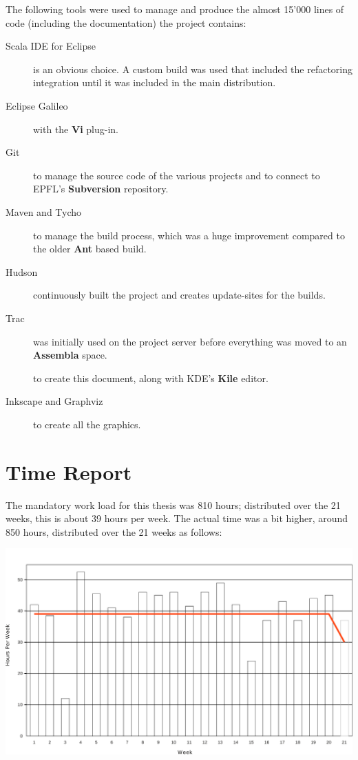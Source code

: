 \documentclass[10pt,a4paper,oneside]{scrreprt}
\begin{document}
The following tools were used to manage and produce the almost 15'000 lines of code (including the documentation) the project contains:

\begin{description}
  \item[Scala IDE for Eclipse] is an obvious choice. A custom build was used that included the refactoring integration until it was included in the main distribution.
  \item[Eclipse Galileo] with the \textbf{Vi} plug-in.
  \item[Git] to manage the source code of the various projects and to connect to EPFL's \textbf{Subversion} repository.
  \item[Maven and Tycho] to manage the build process, which was a huge improvement compared to the older \textbf{Ant} based build.
  \item[Hudson] continuously built the project and creates update-sites for the builds.
  \item[Trac] was initially used on the project server before everything was moved to an \textbf{Assembla} space.
  \item[\LaTeXe] to create this document, along with KDE's \textbf{Kile} editor.
  \item[Inkscape and Graphviz] to create all the graphics.
\end{description}

\section{Time Report}

The mandatory work load for this thesis was 810 hours; distributed over the 21 weeks, this is about 39 hours per week. The actual time was a bit higher, around 850 hours, distributed over the 21 weeks as follows:

\begin{center}
  \includegraphics[width=\linewidth]{time.pdf}
\end{center}
\end{document}
